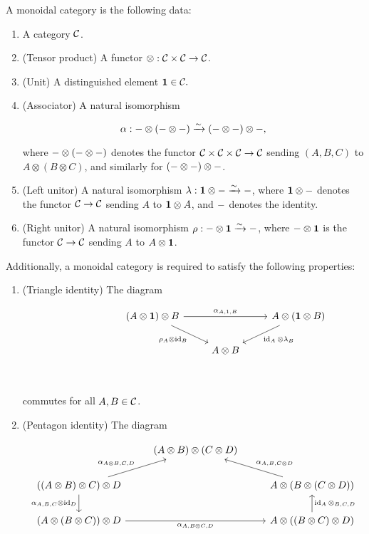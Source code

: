 \begin{defn} A monoidal category is the following data:

\begin{enumerate}
\item A category ${\mathcal C}$.
\item (Tensor product) A functor $\otimes: {\mathcal C} \times {\mathcal C} \to {\mathcal C}$.
\item (Unit) A distinguished element ${\mathbf 1}\in {\mathcal C}.$
\item (Associator) A natural isomorphism

$$\alpha: \--\otimes (\-- \otimes \--) \xrightarrow{\sim} (\--\otimes \--)\otimes \-- , $$

where $\-- \otimes (\--\otimes \--)$ denotes the functor ${\mathcal C}\times {\mathcal C}\times {\mathcal C}\to{\mathcal C}$ sending $(A,B,C)$ to $A\otimes (B\otimes C)$, and similarly for $(\-- \otimes \-- )\otimes\--$.
\item (Left unitor) A natural isomorphism $\lambda: {\mathbf 1}\otimes \-- \xrightarrow{\sim} \--$, where ${\mathbf 1}\otimes \--$ denotes the functor ${\mathcal C}\to {\mathcal C}$ sending $A$ to ${\mathbf 1}\otimes A$, and $\--$ denotes the identity.
\item (Right unitor) A natural isomorphism $\rho: \--\otimes {\mathbf 1} \xrightarrow{\sim} \--$, where $\--\otimes {\mathbf 1}$ is the functor ${\mathcal C}\to {\mathcal C}$ sending $A$ to $A\otimes {\mathbf 1}$.
\end{enumerate}

Additionally, a monoidal category is required to satisfy the following properties:

\begin{enumerate}
\item (Triangle identity) The diagram

\[\begin{tikzcd}
	{} & {} & {\left(A\otimes \bone\right)\otimes B} & {} & {A\otimes (\bone\otimes B)} \\
	&& {} & {A\otimes B} \\
	&&&& {}
	\arrow["{\alpha_{A,1,B}}", from=1-3, to=1-5]
	\arrow["{\rho_A\otimes \id_B}"', from=1-3, to=2-4]
	\arrow["{\id_A\otimes \lambda_B}", from=1-5, to=2-4]
\end{tikzcd}\]

commutes for all $A,B\in {\mathcal C}$.

\item (Pentagon identity) The diagram

\[\begin{tikzcd}
	& {(A\otimes B)\otimes(C\otimes D)} \\
	{((A\otimes B)\otimes C)\otimes D} && {A\otimes (B\otimes (C\otimes D))} \\
	{(A\otimes (B\otimes C))\otimes D} && {A\otimes((B\otimes C)\otimes D)}
	\arrow["{\alpha_{A\otimes B, C,D}}", from=2-1, to=1-2]
	\arrow["{\alpha_{A,B,{C\otimes D}}}"', from=2-3, to=1-2]
	\arrow["{\alpha_{A,B,C}\otimes \id_D}"', from=2-1, to=3-1]
	\arrow["{\id_A\otimes_{B,C,D}}"', from=3-3, to=2-3]
	\arrow["{\alpha_{A,B\otimes C,D}}"', from=3-1, to=3-3]
\end{tikzcd}\]


\end{enumerate}
\end{defn}
